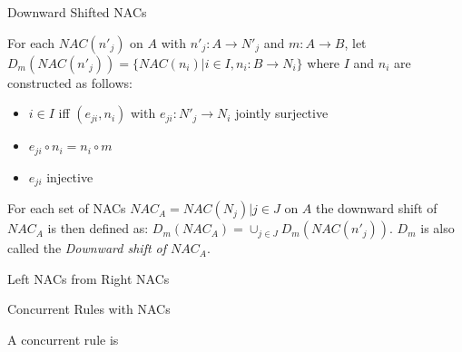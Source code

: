 \begin{definition}{Downward Shifted NACs}


For each $NAC(n'_j)$ on $A$ with $n'_j : A \rightarrow N'_j$ and $m : A \rightarrow B$, 
let $D_m(NAC(n'_j)) = \{ NAC(n_i)|i \in I, n_i : B \rightarrow N_i \}$ where $I$ and $n_i$ 
are constructed as follows:
\begin{itemize}
  \item $i \in I$ iff $(e_{ji}, n_i)$ with $e_{ji} : N'_j \rightarrow N_i$ jointly surjective 
  \item $e_{ji} \circ n_i = n_i \circ m$
  \item $e_{ji}$ injective
\end{itemize}

For each set of NACs $NAC_A = {NAC(N_j)| j \in J}$ on $A$ the downward shift of $NAC_A$ is then defined as: $D_m(NAC_A) = \cup_{j \in J}D_m(NAC(n'_j))$. $D_m$ is also called the \emph{Downward shift of $NAC_A$}.

\end{definition}

\begin{definition}{Left NACs from Right NACs}

\centerline{}

\end{definition}

\begin{definition}{Concurrent Rules with NACs}

A concurrent rule is
\end{definition}

\centerline{
}

